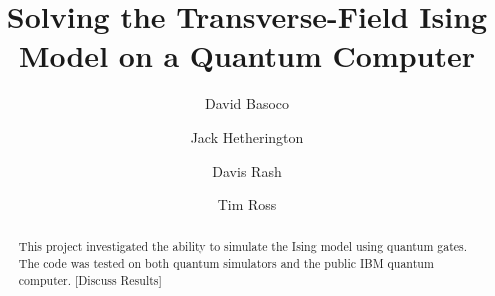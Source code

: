\documentclass[acmtog]{acmart}
\begin{document}
\title{Solving the Transverse-Field Ising Model on a Quantum Computer}

\author{David Basoco}

\author{Jack Hetherington}

\author{Davis Rash}

\author{Tim Ross}

\begin{abstract}
 This project investigated the ability to simulate the Ising model using quantum gates. The code was tested on both quantum simulators and the public IBM quantum computer. [Discuss Results]
\end{abstract}



\maketitle
\end{document}
